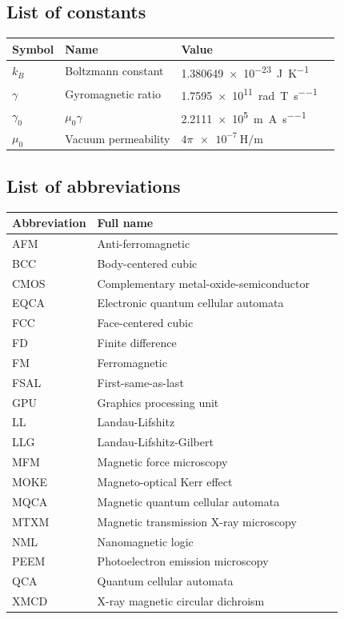 \documentclass[11pt,a4paper,english]{article}
\begin{document}

\clearpage
{\hypersetup{linkcolor=black}
\tableofcontents
}
\newpage
\subsection*{List of constants}
\begin{longtable}{llll}
\toprule
\bfseries Symbol & \bfseries Name &
\bfseries Value \\\midrule\endhead
$k_B$ & Boltzmann constant & \SI{1.380649e-23}{\joule\per\kelvin} \\
\midrule
$\gamma$ & Gyromagnetic ratio & \SI{1.7595e11}{\radian\per\tesla\per\second} \\
$\gamma_0$ & $\mu_0 \gamma$ & \SI{2.2111e5}{\metre\per\ampere\per\second} \\
$\mu_0$ & Vacuum permeability & $4\pi\SI{e-7}{\henry\per\metre}$ \\
\bottomrule
\end{longtable}

\subsection*{List of abbreviations}
\begin{longtable}{llll}
\toprule
\bfseries Abbreviation & \bfseries Full name \\\midrule\endhead
AFM & Anti-ferromagnetic \\
BCC & Body-centered cubic \\
CMOS & Complementary metal-oxide-semiconductor \\
EQCA & Electronic quantum cellular automata \\
FCC & Face-centered cubic \\
FD & Finite difference \\
FM & Ferromagnetic \\
FSAL & First-same-as-last \\
GPU & Graphics processing unit \\
LL & Landau-Lifshitz \\
LLG & Landau-Lifshitz-Gilbert \\
MFM & Magnetic force microscopy \\
MOKE & Magneto-optical Kerr effect \\
MQCA & Magnetic quantum cellular automata \\
MTXM & Magnetic transmission X-ray microscopy \\
NML & Nanomagnetic logic \\
PEEM & Photoelectron emission microscopy \\
QCA & Quantum cellular automata \\
XMCD & X-ray magnetic circular dichroism \\
\bottomrule
\end{longtable}
\end{document}
